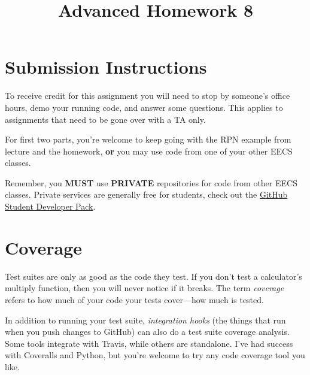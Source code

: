 \documentclass{article}
\begin{document}
\fancyfoot[C]{\color{gray} \thepage~/~\pageref*{LastPage}}
\pagestyle{fancyplain}

\title{\textbf{Advanced Homework 8\\}}
\author{\textbf{\color{red}{Due: Wednesday, November 8th, 11:59PM (Hard Deadline)}}}
\date{}
\maketitle


\section*{Submission Instructions}
To receive credit for this assignment you will need to stop by someone's
office hours, demo your running code, and answer some questions. \textbf{\color{red}{Make sure
to check the office hour schedule as the real due date is at the last office
hours before the date listed above.}} This applies to assignments that need to be gone over with a TA only.


\begin{mdframed}[innerleftmargin=38pt,innerrightmargin=38pt]\justify
  For first two parts, you're welcome to keep going with the RPN example from
  lecture and the homework, \textbf{or} you may use code from one of your
  other EECS classes.

  {\color{red}Remember, you \textbf{MUST} use \textbf{PRIVATE} repositories
    for code from other EECS classes.} Private services are generally free for
  students, check out the \href{https://education.github.com/pack}{GitHub Student Developer Pack}.
\end{mdframed}

\section{Coverage}

Test suites are only as good as the code they test. If you don't test a
calculator's multiply function, then you will never notice if it breaks. The
term \emph{coverage} refers to how much of your code your tests cover---how
much is tested.

In addition to running your test suite, \emph{integration hooks} (the things
that run when you push changes to GitHub) can also do a test suite coverage
analysis. Some tools integrate with Travis, while others are standalone. I've
had success with Coveralls and Python, but you're welcome to try any code
coverage tool you like.
\end{document}
